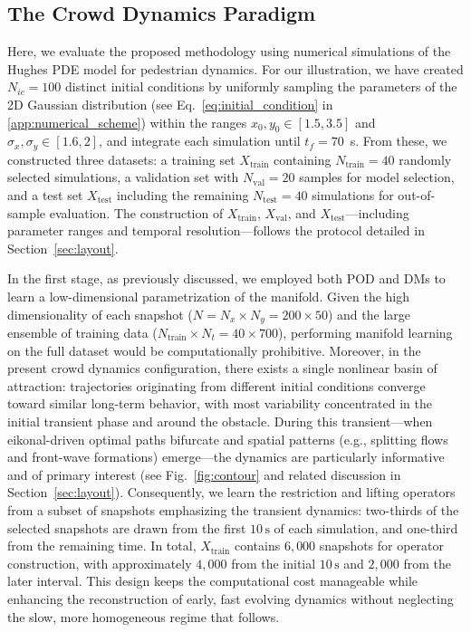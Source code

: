 \documentclass{article}
\begin{document}
\subsection{The Crowd Dynamics Paradigm}
\label{subsec:crowd}
Here, we evaluate the proposed methodology using numerical simulations of the Hughes PDE model for pedestrian dynamics. For our illustration, we have created \(N_{ic} = 100\) distinct initial conditions by uniformly sampling the parameters of the 2D Gaussian distribution (see Eq.~\eqref{eq:initial_condition} in \ref{app:numerical_scheme}) within the ranges \(x_0, y_0 \in [1.5, 3.5]\) and \(\sigma_x, \sigma_y \in [1.6,2]\), and integrate each simulation until \(t_f = 70\)~s. From these, we constructed three datasets: a training set \(X_{\text{train}}\) containing \(N_{\text{train}} = 40\) randomly selected simulations, a validation set with \(N_{\text{val}} = 20\) samples for model selection, and a test set \(X_{\text{test}}\) including the remaining \(N_{\text{test}} = 40\) simulations for out-of-sample evaluation.
The construction of \(X_{\text{train}}\), \(X_{\text{val}}\), and \(X_{\text{test}}\)—including parameter ranges and temporal resolution—follows the protocol detailed in Section~\ref{sec:layout}. 

In the first stage, as previously discussed, we employed both POD and DMs to learn a low-dimensional parametrization of the manifold. Given the high dimensionality of each snapshot (\(N = N_x \times N_y = 200 \times 50\)) and the large ensemble of training data (\(N_{\text{train}} \times N_t = 40 \times 700\)), performing manifold learning on the full dataset would be computationally prohibitive. Moreover, in the present crowd dynamics configuration, there exists a single nonlinear basin of attraction: trajectories originating from different initial conditions converge toward similar long-term behavior, with most variability concentrated in the initial transient phase and around the obstacle. During this transient—when eikonal-driven optimal paths bifurcate and spatial patterns (e.g., splitting flows and front-wave formations) emerge—the dynamics are particularly informative and of primary interest (see Fig.~\ref{fig:contour} and related discussion in Section~\ref{sec:layout}). 
Consequently, we learn the restriction and lifting operators from a subset of snapshots emphasizing the transient dynamics: two-thirds of the selected snapshots are drawn from the first \(10\,\text{s}\) of each simulation, and one-third from the remaining time. In total, \(X_{\text{train}}\) contains \(6{,}000\) snapshots for operator construction, with approximately \(4{,}000\) from the initial \(10\,\text{s}\) and \(2{,}000\) from the later interval. This design keeps the computational cost manageable while enhancing the reconstruction of early, fast evolving dynamics without neglecting the slow, more homogeneous regime that follows.
\end{document}
